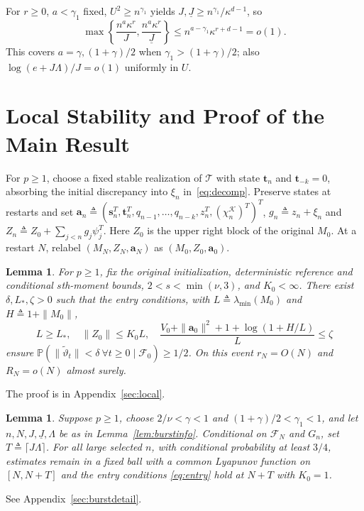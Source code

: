 \documentclass[11pt,reqno]{amsart}
\numberwithin{equation}{section}
\newtheorem{lemma}[theorem]{Lemma}
\theoremstyle{definition}
\theoremstyle{remark}
\newcommand{\Prob}{\mathbb P}
\newcommand{\F}{\mathcal F}
\newcommand{\etac}{\widetilde{\vartheta}}
\begin{document}
For $r\ge0$, $a<\gamma_1$ fixed, $U^2\ge n^{\gamma_1}$ yields $J,\underline J\ge n^{\gamma_1}/\kappa^{d-1}$, so
\begin{equation}\label{eq:scales}
 \max\left\{\frac{n^a\kappa^r}{J},\frac{n^a\kappa^r}{\underline J}\right\}
 \le n^{a-\gamma_1}\kappa^{r+d-1}=o(1).
\end{equation}
This covers $a=\gamma,(1+\gamma)/2$ when $\gamma_1>(1+\gamma)/2$; also $\log(e+J\Lambda)/J=o(1)$ uniformly in $U$.

\section{Local Stability and Proof of the Main Result}\label{sec:persistence}
For $p\ge1$, choose a fixed stable realization of $\mathcal T$ with state $\mathbf t_n$ and $\mathbf t_{-k}=0$, absorbing the initial discrepancy into $\xi_n$ in~\eqref{eq:decomp}. Preserve states at restarts and set $\mathbf a_n\triangleq(\mathbf s_n^T,\mathbf t_n^T,q_{n-1},\ldots,q_{n-k},z_n^T,(\chi_n^{\mathcal K})^T)^T$, $g_n\triangleq z_n+\xi_n$ and $Z_n\triangleq Z_0+\sum_{j<n}g_j\psi_j^T$.
Here $Z_0$ is the upper right block of the original $M_0$. At a restart $N$, relabel $(M_N,Z_N,\mathbf a_N)$ as $(M_0,Z_0,\mathbf a_0)$.
\begin{lemma}\label{lem:nonexit}
For $p\ge1$, fix the original initialization, deterministic reference and conditional $s$th-moment bounds, $2<s<\min(\nu,3)$, and $K_0<\infty$. There exist $\delta,L_*,\zeta>0$ such that the entry conditions, with $L\triangleq\lambda_{\min}(M_0)$ and $H\triangleq1+\|M_0\|$,
\begin{equation}\label{eq:entry}
 L\ge L_*,\quad\|Z_0\|\le K_0L,\quad
 \frac{V_0+\|\mathbf a_0\|^2+1+\log(1+H/L)}{L}\le\zeta
\end{equation}
ensure $\Prob(\|\etac_t\|<\delta\ \forall t\ge0\mid\F_0)\ge1/2$. On this event $r_N=O(N)$ and $R_N=o(N)$ almost surely.
\end{lemma}
The proof is in Appendix~\ref{sec:local}.
\begin{lemma}\label{lem:transition}
Suppose $p\ge1$, choose $2/\nu<\gamma<1$ and
$(1+\gamma)/2<\gamma_1<1$, and let $n,N,J,\underline J,\Lambda$ be as in
Lemma~\ref{lem:burstinfo}. Conditional on $\F_N$ and $G_n$, set
$T\triangleq\lceil J\Lambda\rceil$.
For all large selected $n$, with conditional probability at least $3/4$, estimates remain in a fixed ball with a common Lyapunov function on $[N,N+T]$ and the entry conditions
\eqref{eq:entry} hold at $N+T$ with $K_0=1$. 
\end{lemma}
See Appendix~\ref{sec:burstdetail}.
\end{document}
